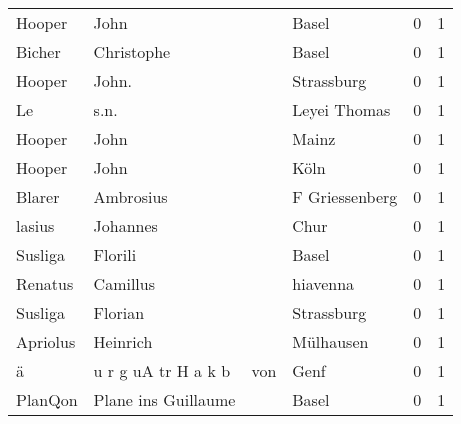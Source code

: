 \documentclass[10pt,a4paper,landscape]{article}
\begin{document}
\begin{longtable}{llllrr}
                   Hooper &                               John &             &                                       Basel &          0 &         1 \\
                   Bicher &                         Christophe &             &                                       Basel &          0 &         1 \\
                   Hooper &                              John. &             &                                  Strassburg &          0 &         1 \\
                       Le &                               s.n. &             &                                Leyei Thomas &          0 &         1 \\
                   Hooper &                               John &             &                                       Mainz &          0 &         1 \\
                   Hooper &                               John &             &                                        Köln &          0 &         1 \\
                   Blarer &                          Ambrosius &             &                              F Griessenberg &          0 &         1 \\
                   lasius &                           Johannes &             &                                        Chur &          0 &         1 \\
                  Susliga &                            Florili &             &                                       Basel &          0 &         1 \\
                  Renatus &                           Camillus &             &                                    hiavenna &          0 &         1 \\
                  Susliga &                            Florian &             &                                  Strassburg &          0 &         1 \\
                 Apriolus &                           Heinrich &             &                                   Mülhausen &          0 &         1 \\
                        ä &                u r g uA tr H a k b &         von &                                        Genf &          0 &         1 \\
                  PlanQon &                Plane ins Guillaume &             &                                       Basel &          0 &         1 \\

\end{longtable}
\end{document}
